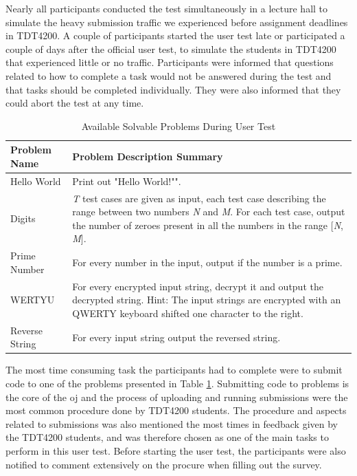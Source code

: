 Nearly all participants conducted the test simultaneously in a lecture hall to simulate the heavy submission traffic we experienced before assignment deadlines in TDT4200. A couple of participants started the user test late or participated a couple of days after the official user test, to simulate the students in TDT4200 that experienced little or no traffic. Participants were informed that questions related to how to complete a task would not be answered during the test and that tasks should be completed individually. They were also informed that they could abort the test at any time. \\

\begin{table}
    \centering
    \begin{tabular}{ | l | p{6cm} |}
    \hline
    \textbf{Problem Name} & \textbf{Problem Description Summary} \\ \hline
    Hello World & Print out "Hello World!"". \\ \hline
    Digits & \textit{T} test cases are given as input, each test case describing the range between two numbers \textit{N} and \textit{M}. For each test case, output the number of zeroes present in all the numbers in the range [\textit{N}, \textit{M}]. \\ \hline
    Prime Number & For every number in the input, output if the number is a prime. \\ \hline
    WERTYU & For every encrypted input string, decrypt it and output the decrypted string. Hint: The input strings are encrypted with an QWERTY keyboard shifted one character to the right. \\ \hline
    Reverse String & For every input string output the reversed string. \\
    \hline
    \end{tabular}
    \caption{Available Solvable Problems During User Test}
    \label{tab:avail-prob}
\end{table}

The most time consuming task the participants had to complete were to submit code to one of the problems presented in Table \ref{tab:avail-prob}. Submitting code to problems is the core of the \gls{oj} and the process of uploading and running submissions were the most common procedure done by TDT4200 students. The procedure and aspects related to submissions was also mentioned the most times in feedback given by the TDT4200 students, and was therefore chosen as one of the main tasks to perform in this user test. Before starting the user test, the participants were also notified to comment extensively on the procure when filling out the survey. \\

